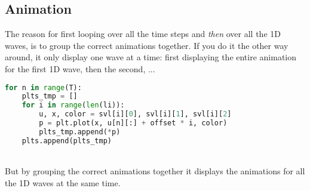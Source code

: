 \documentclass{article}
\begin{document}
\subsection{Animation}
The reason for first looping over all the time steps and \textit{then} over all the 1D waves, is to group the correct animations together. If you do it the other way around, it only display one wave at a time: first displaying the entire animation for the first 1D wave, then the second, ...

\begin{lstlisting}[language=Python, caption=Initial Condition]
for n in range(T):
    plts_tmp = []
    for i in range(len(li)):
        u, x, color = svl[i][0], svl[i][1], svl[i][2]
        p = plt.plot(x, u[n][:] + offset * i, color)
        plts_tmp.append(*p)
    plts.append(plts_tmp)
\end{lstlisting}

\noindent\\But by grouping the correct animations together it displays the animations for all the 1D waves at the same time.

\newpage
\printbibliography
\end{document}
